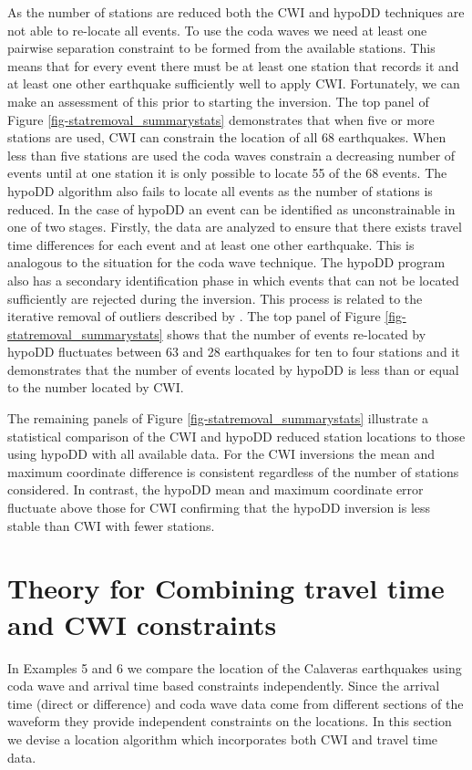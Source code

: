 \documentclass[extra, onecolumn, doublespacing]{gji}
\begin{document}
As the number of stations are reduced both the CWI and hypoDD
techniques are not able to re-locate all events. To use the coda
waves we need at least one pairwise separation constraint to be
formed from the available stations. This means that for every event
there must be at least one station that records it and at least one
other earthquake sufficiently well to apply CWI. Fortunately, we can
make an assessment of this prior to starting the inversion. The top
panel of Figure \ref{fig-statremoval_summarystats} demonstrates that
when five or more stations are used, CWI can constrain the location
of all 68 earthquakes. When less than five stations are used the
coda waves constrain a decreasing number of events until at one
station it is only possible to locate 55 of the 68 events. The
hypoDD algorithm also fails to locate all events as the number of
stations is reduced. In the case of hypoDD an event can be
identified as unconstrainable in one of two stages. Firstly, the
data are analyzed to ensure that there exists travel time
differences for each event and at least one other earthquake. This
is analogous to the situation for the coda wave technique. The
hypoDD program also has a secondary identification phase in which
events that can not be located sufficiently are rejected during the
inversion. This process is related to the iterative removal of
outliers described by \citet{dr_Waldhauser00a}. The top panel of
Figure \ref{fig-statremoval_summarystats} shows that the number of
events re-located by hypoDD fluctuates between 63 and 28 earthquakes
for ten to four stations and it demonstrates that the number of
events located by hypoDD is less than or equal to the number located
by CWI.


The remaining panels of Figure \ref{fig-statremoval_summarystats}
illustrate a statistical comparison of the CWI and hypoDD reduced
station locations to those using hypoDD with all available data. For
the CWI inversions the mean and maximum coordinate difference is
consistent regardless of the number of stations considered. In
contrast, the hypoDD mean and maximum coordinate error fluctuate
above those for CWI confirming that the hypoDD inversion is less
stable than CWI with fewer stations.

\section{Theory for Combining travel time and CWI constraints}
\label{sec:CalaverasLoc-CWIandTT}
In Examples 5 and 6 we compare the location of the Calaveras
earthquakes using coda wave and arrival time based constraints
independently. Since the arrival time (direct or difference) and
coda wave data
 come from different sections of the waveform they provide independent constraints on the locations.
 In this section we devise a location algorithm which incorporates
 both CWI and travel time data.
\end{document}
